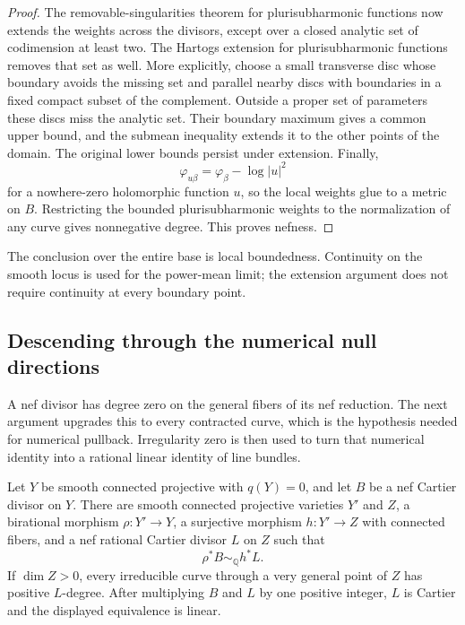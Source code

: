 \begin{proof}
The removable-singularities theorem for plurisubharmonic functions
now extends the weights across the divisors, except over a closed
analytic set of codimension at least two.  The Hartogs extension
for plurisubharmonic functions removes that set as well.  More
explicitly, choose a small transverse disc whose boundary avoids
the missing set and parallel nearby discs with boundaries in a
fixed compact subset of the complement.  Outside a proper set of
parameters these discs miss the analytic set.  Their boundary
maximum gives a common upper bound, and the submean inequality
extends it to the other points of the domain.  The original lower
bounds persist under extension.  Finally,
\[
 \varphi_{u\beta}=\varphi_\beta-\log|u|^2
\]
for a nowhere-zero holomorphic function $u$, so the local weights
glue to a metric on $B$.  Restricting the bounded plurisubharmonic
weights to the normalization of any curve gives nonnegative
degree.  This proves nefness.
\end{proof}

The conclusion over the entire base is local boundedness.  Continuity
on the smooth locus is used for the power-mean limit; the extension
argument does not require continuity at every boundary point.

\subsection{Descending through the numerical null directions}

A nef divisor has degree zero on the general fibers of its nef
reduction.  The next argument upgrades this to every contracted
curve, which is the hypothesis needed for numerical pullback.
Irregularity zero is then used to turn that numerical identity into
a rational linear identity of line bundles.

\begin{lemma}\label{V:nef-descent}
Let $Y$ be smooth connected projective with $q(Y)=0$, and let $B$ be a
nef Cartier divisor on $Y$.  There are smooth connected projective
varieties $Y'$ and $Z$, a birational morphism $\rho:Y'\to Y$, a
surjective morphism $h:Y'\to Z$ with connected fibers, and a nef rational
Cartier divisor $L$ on $Z$ such that
\[
 \rho^*B\sim_{\mathbb Q}h^*L.
\]
If $\dim Z>0$, every irreducible curve through a very general point of
$Z$ has positive $L$-degree.  After multiplying $B$ and $L$ by one
positive integer, $L$ is Cartier and the displayed equivalence is linear.
\end{lemma}

